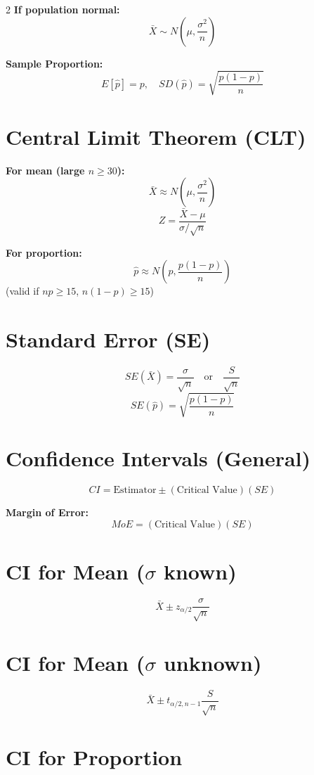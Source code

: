 \documentclass[10pt]{article}
\begin{document}
\begin{multicols}{2}
\textbf{If population normal:}
\[
\bar{X} \sim N\left(\mu, \frac{\sigma^2}{n}\right)
\]

\textbf{Sample Proportion:}
\[
E[\hat{p}] = p, \quad SD(\hat{p}) = \sqrt{\frac{p(1-p)}{n}}
\]

\section*{Central Limit Theorem (CLT)}

\textbf{For mean (large $n \ge 30$):}
\[
\bar{X} \approx N\left(\mu, \frac{\sigma^2}{n}\right)
\]
\[
Z = \frac{\bar{X} - \mu}{\sigma/\sqrt{n}}
\]

\textbf{For proportion:}
\[
\hat{p} \approx N\left(p, \frac{p(1-p)}{n}\right)
\]
(valid if $np \ge 15$, $n(1-p) \ge 15$)

\section*{Standard Error (SE)}

\[
SE(\bar{X}) = \frac{\sigma}{\sqrt{n}} \quad \text{or} \quad \frac{S}{\sqrt{n}}
\]
\[
SE(\hat{p}) = \sqrt{\frac{p(1-p)}{n}}
\]

\section*{Confidence Intervals (General)}

\[
CI = \text{Estimator} \pm (\text{Critical Value})(SE)
\]

\textbf{Margin of Error:}
\[
MoE = (\text{Critical Value})(SE)
\]

\section*{CI for Mean ($\sigma$ known)}

\[
\bar{X} \pm z_{\alpha/2} \frac{\sigma}{\sqrt{n}}
\]

\section*{CI for Mean ($\sigma$ unknown)}

\[
\bar{X} \pm t_{\alpha/2, n-1} \frac{S}{\sqrt{n}}
\]

\section*{CI for Proportion}


\end{multicols}
\end{document}
